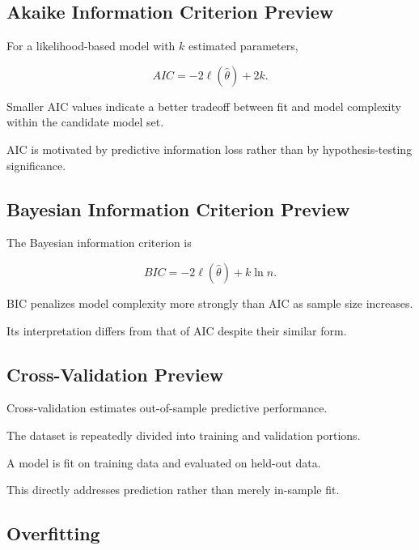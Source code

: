 \subsection{Akaike Information Criterion Preview}
\label{subsec:aic-preview}

For a likelihood-based model with \(k\) estimated parameters,

\[
\boxed{
AIC
=
-2\ell(\widehat{\theta})
+
2k.
}
\]

Smaller AIC values indicate a better tradeoff between fit and model
complexity within the candidate model set.

AIC is motivated by predictive information loss rather than by
hypothesis-testing significance.

\subsection{Bayesian Information Criterion Preview}
\label{subsec:bic-preview}

The Bayesian information criterion is

\[
\boxed{
BIC
=
-2\ell(\widehat{\theta})
+
k\ln n.
}
\]

BIC penalizes model complexity more strongly than AIC as sample size
increases.

Its interpretation differs from that of AIC despite their similar form.

\subsection{Cross-Validation Preview}
\label{subsec:cross-validation-regression}

Cross-validation estimates out-of-sample predictive performance.

The dataset is repeatedly divided into training and validation portions.

A model is fit on training data and evaluated on held-out data.

This directly addresses prediction rather than merely in-sample fit.

\subsection{Overfitting}
\label{subsec:regression-overfitting}

